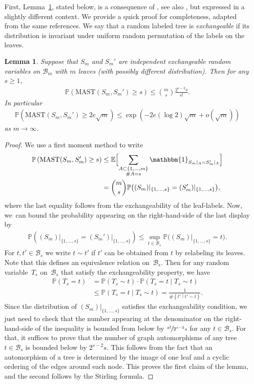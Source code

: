 \documentclass[JEP,XML,SOM,Unicode,NoFloatCountersInSection,published]{cedram}
\newcommand{\BEc}[1]{\mathbb{E} \Bigl[#1\Bigr]}
\newcommand{\Pp}[1]{\mathbb{P} \left(#1\right)}
\newcommand{\bPp}[1]{\mathbb{P} \bigl(#1\bigr)}
\newcommand{\Ppsq}[2]{\mathbb{P} \left(#1\mathrel{}\middle|\mathrel{}#2\right)}
\newcommand{\enstq}[2]{\left\lbrace#1\mathrel{}\middle|\mathrel{}#2\right\rbrace}
\theoremstyle{plain}
\newtheorem{lemma}[theorem]{Lemma}
\theoremstyle{definition}
\begin{document}
First, Lemma~\ref{lem:square root bounds on size of mast}, stated below, is a consequence of \cite[Lem.\,4.1]{bryant_size_2003}, see also \cite[Lem.\,4.1, Prop.\,4.2]{bernstein_bounds_2015}, but expressed in a slightly different context.
We provide a quick proof for completeness, adapted from the same references. We say that a random labeled tree is \emph{exchangeable} if its distribution is invariant under uniform random permutation of the labels on the leaves.
\begin{lemma}\label{lem:square root bounds on size of mast}
Suppose that $S_m$ and $S_m'$ are independent exchangeable random variables on $\mathcal{B}_m$ with $m$ leaves (with possibly different distribution). Then for any $s\geq 1$,
\begin{align*}
\Pp{\mathrm{MAST}(S_m,S_m') \geq s} \leq \binom{m}{s} \frac{2^{s-2}s}{s!}.
\end{align*}
In particular
\begin{align*}
\Pp{\mathrm{MAST}(S_m,S_m') \geq 2 e \sqrt{m}} \leq \exp \left(-2e (\log 2) \sqrt{m} + o(\sqrt{m}) \right)
\end{align*}
as $m \rightarrow \infty$.
\end{lemma}
\begin{proof}
We use a first moment method to write
\begin{align*}
\Pp{\mathrm{MAST}(S_m,S_m')\geq s} &\leq \BEc{\sum_{\substack{A\subset \{1,\dots,m\}\\ \#A=s}} \mathbbm{1}_{S_m\vert_A=S_m'\vert_A}} \\
&=\binom{m}{s} \bPp{(S_m)\vert_{\{1,\dots,s\}}=(S_m')\vert_{\{1,\dots,s\}}},
\end{align*}
where the last equality follows from the exchangeability of the leaf-labels.
Now, we~can bound the probability appearing on the right-hand-side of the last display by
\begin{align*}
\Pp{(S_m)\vert_{\{1,\dots,s\}}=(S_m')\vert_{\{1,\dots,s\}}}
\leq \sup_{t\in \mathcal{B}_s} \bPp{(S_m)\vert_{\{1,\dots,s\}}=t}.
\end{align*}
For $t,t'\in \mathcal{B}_s$ we write $t\sim t'$ if $t'$ can be obtained from $t$ by relabeling its leaves.
Note that this defines an equivalence relation on~$\mathcal{B}_s$.
Then for any random variable~$T_s$ on~$\mathcal{B}_s$ that satisfy the exchangeability property, we have
\begin{align*}
\Pp{T_s=t} &= \Pp{T_s\sim t} \cdot \Ppsq{T_s=t}{T_s\sim t}\\
& \leq \Ppsq{T_s=t}{T_s\sim t}=\frac{1}{\#\enstq{t'}{t'\sim t}}.
\end{align*}
Since the distribution of $(S_m)\vert_{\{1,\dots,s\}}$ satisfies the exchangeability condition, we just need to check that the number appearing at the denominator on the right-hand-side of the inequality is bounded from below by $\sfrac{s!}{2^{s-2}s}$ for any $t\in \mathcal{B}_s$.
For that, it suffices to prove that the number of graph automorphisms of any tree $t\in \mathcal{B}_s$ is bounded below by $2^{s-2}s$. This follows from the fact that an automorphism of a tree is determined by the image of one leaf and a cyclic ordering of the edges around each node. This proves the first claim of the lemma, and the second follows by the Stirling formula.
\end{proof}
\end{document}
